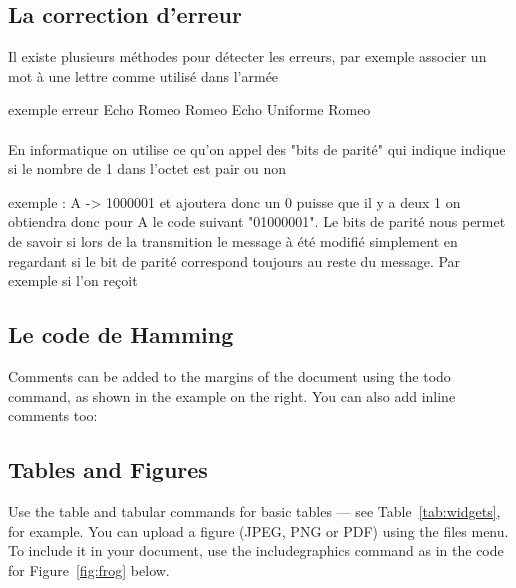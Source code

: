 \subsection{La correction d'erreur}

Il existe plusieurs méthodes pour détecter les erreurs, par exemple associer un mot à une lettre comme utilisé dans l'armée \colon

\hspace{1cm} exemple \colon erreur \rightarrow Echo Romeo Romeo Echo Uniforme Romeo
\\\\
En informatique on utilise ce qu'on appel des "bits de parité" qui indique indique si le nombre de 1 dans l'octet est pair ou non

exemple : A -> 1000001 et ajoutera donc un 0 puisse que il y a deux 1 on obtiendra donc pour A le code suivant "01000001".
Le bits de parité nous permet de savoir si lors de la transmition le message à été modifié simplement en regardant si le bit de parité correspond toujours au reste du message. Par exemple si l'on reçoit

\subsection{Le code de Hamming}

Comments can be added to the margins of the document using the  todo command, as shown in the example on the right. You can also add inline comments too:


\subsection{Tables and Figures}

Use the table and tabular commands for basic tables --- see Table~\ref{tab:widgets}, for example. You can upload a figure (JPEG, PNG or PDF) using the files menu. To include it in your document, use the includegraphics command as in the code for Figure~\ref{fig:frog} below.



